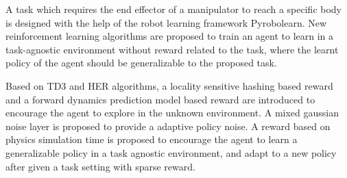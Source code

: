 \begin{eabstract}
A task which requires the end effector of a manipulator to reach a specific body is designed with the help of the robot learning framework Pyrobolearn. New reinforcement learning algorithms are proposed to train an agent to learn in a task-agnostic environment without reward related to the task, where the learnt policy of the agent should be generalizable to the proposed task.

Based on TD3 and HER algorithms, a locality sensitive hashing based reward and a forward dynamics prediction model based reward are introduced to encourage the agent to explore in the unknown environment. A mixed gaussian noise layer is proposed to provide a adaptive policy noise. A reward based on physics simulation time is proposed to encourage the agent to learn a generalizable policy in a task agnostic environment, and adapt to a new policy after given a task setting with sparse reward.
\end{eabstract}
